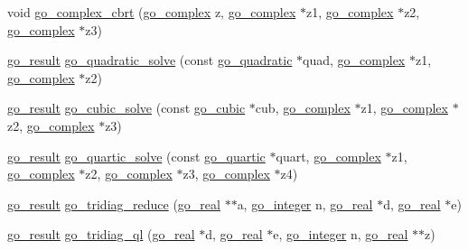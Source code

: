 \begin{DoxyCompactItemize}
\item 
void \hyperlink{namespacegomotion_aa82cab05f61afb7c64c622f9810d6fc0}{go\-\_\-complex\-\_\-cbrt} (\hyperlink{structgomotion_1_1go__complex}{go\-\_\-complex} z, \hyperlink{structgomotion_1_1go__complex}{go\-\_\-complex} $\ast$z1, \hyperlink{structgomotion_1_1go__complex}{go\-\_\-complex} $\ast$z2, \hyperlink{structgomotion_1_1go__complex}{go\-\_\-complex} $\ast$z3)
\item 
\hyperlink{gotypes_8h_a55d48b38cd959f63c7e8db8337a9792a}{go\-\_\-result} \hyperlink{namespacegomotion_ad3de720de88b3adacfa18b1d87cfdebb}{go\-\_\-quadratic\-\_\-solve} (const \hyperlink{structgomotion_1_1go__quadratic}{go\-\_\-quadratic} $\ast$quad, \hyperlink{structgomotion_1_1go__complex}{go\-\_\-complex} $\ast$z1, \hyperlink{structgomotion_1_1go__complex}{go\-\_\-complex} $\ast$z2)
\item 
\hyperlink{gotypes_8h_a55d48b38cd959f63c7e8db8337a9792a}{go\-\_\-result} \hyperlink{namespacegomotion_a9ac60820934c5a8b4ae3c05c7e125d41}{go\-\_\-cubic\-\_\-solve} (const \hyperlink{structgomotion_1_1go__cubic}{go\-\_\-cubic} $\ast$cub, \hyperlink{structgomotion_1_1go__complex}{go\-\_\-complex} $\ast$z1, \hyperlink{structgomotion_1_1go__complex}{go\-\_\-complex} $\ast$z2, \hyperlink{structgomotion_1_1go__complex}{go\-\_\-complex} $\ast$z3)
\item 
\hyperlink{gotypes_8h_a55d48b38cd959f63c7e8db8337a9792a}{go\-\_\-result} \hyperlink{namespacegomotion_a3e71624097e1cbd2dced92058930ddf4}{go\-\_\-quartic\-\_\-solve} (const \hyperlink{structgomotion_1_1go__quartic}{go\-\_\-quartic} $\ast$quart, \hyperlink{structgomotion_1_1go__complex}{go\-\_\-complex} $\ast$z1, \hyperlink{structgomotion_1_1go__complex}{go\-\_\-complex} $\ast$z2, \hyperlink{structgomotion_1_1go__complex}{go\-\_\-complex} $\ast$z3, \hyperlink{structgomotion_1_1go__complex}{go\-\_\-complex} $\ast$z4)
\item 
\hyperlink{gotypes_8h_a55d48b38cd959f63c7e8db8337a9792a}{go\-\_\-result} \hyperlink{namespacegomotion_a7cb3e7889225e10a664f3a18a4544b6a}{go\-\_\-tridiag\-\_\-reduce} (\hyperlink{gotypes_8h_afd666a2393eebd71ee455846ac9def9b}{go\-\_\-real} $\ast$$\ast$a, \hyperlink{gotypes_8h_a7d30f606bb0f58ffe2b3bd71e5c8af5c}{go\-\_\-integer} n, \hyperlink{gotypes_8h_afd666a2393eebd71ee455846ac9def9b}{go\-\_\-real} $\ast$d, \hyperlink{gotypes_8h_afd666a2393eebd71ee455846ac9def9b}{go\-\_\-real} $\ast$e)
\item 
\hyperlink{gotypes_8h_a55d48b38cd959f63c7e8db8337a9792a}{go\-\_\-result} \hyperlink{namespacegomotion_a8cdb1cdd1aa1fe79e05cdce767172a43}{go\-\_\-tridiag\-\_\-ql} (\hyperlink{gotypes_8h_afd666a2393eebd71ee455846ac9def9b}{go\-\_\-real} $\ast$d, \hyperlink{gotypes_8h_afd666a2393eebd71ee455846ac9def9b}{go\-\_\-real} $\ast$e, \hyperlink{gotypes_8h_a7d30f606bb0f58ffe2b3bd71e5c8af5c}{go\-\_\-integer} n, \hyperlink{gotypes_8h_afd666a2393eebd71ee455846ac9def9b}{go\-\_\-real} $\ast$$\ast$z)

\end{DoxyCompactItemize}
